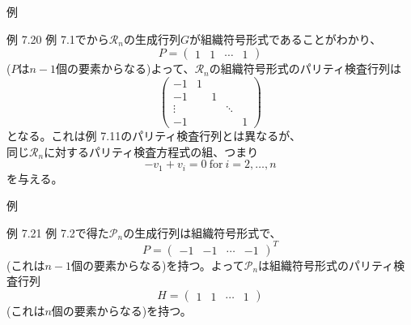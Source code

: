 \documentclass[dvipdfmx,10pt,jsarticle]{beamer}
\begin{document}
  \begin{frame}{例}
    \begin{block}{例 7.20}
      例 7.1でから$\mathcal{R}_n$の生成行列$G$が組織符号形式であることがわかり、
      \[ P = \begin{pmatrix}
          1 & 1 & \cdots & 1
      \end{pmatrix} \]
      ($P$は$n - 1$個の要素からなる)よって、$\mathcal{R}_n$の組織符号形式のパリティ検査行列は
      \[ \begin{pmatrix}
          -1 & 1  \\
          -1 &   & 1 \\
          \vdots &   &   & \ddots \\
          -1 &  &  &   & 1
      \end{pmatrix}  \]
      となる。これは例 7.11のパリティ検査行列とは異なるが、 \\
      同じ$\mathcal{R}_n$に対するパリティ検査方程式の組、つまり
      \[-v_1 + v_i = 0 \ \text{for} \ i  = 2, \ldots, n\]
      を与える。
    \end{block}
  \end{frame}

  \begin{frame}{例}
    \begin{block}{例 7.21}
      例 7.2で得た$\mathcal{P}_n$の生成行列は組織符号形式で、
      \[ P = \begin{pmatrix}
          -1 & -1 & \cdots & -1
      \end{pmatrix}^T \]
      (これは$n - 1$個の要素からなる)を持つ。よって$\mathcal{P}_n$は組織符号形式のパリティ検査行列
      \[ H = \begin{pmatrix}
          1 & 1 & \cdots & 1
      \end{pmatrix} \]
      (これは$n$個の要素からなる)を持つ。
    \end{block}
  \end{frame}
\end{document}
